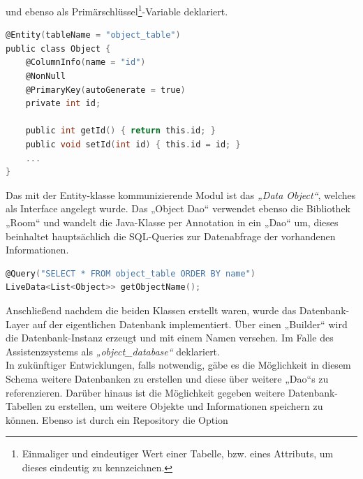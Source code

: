 und ebenso als Primärschlüssel\footnote{Einmaliger und eindeutiger Wert einer Tabelle, bzw. eines Attributs, um dieses eindeutig zu kennzeichnen.}-Variable 
deklariert.
\\ 
\linebreak
\begin{lstlisting}[language=C,
    frame=lines,           % Ein Rahmen um den Code (single for box, lines for top and bottom)
    xleftmargin=\parindent,  % Rahmen link von den Zahlen
    style=algoBericht,
    label={code:entity},
    captionpos=b,           % Caption unter den Code setzen
caption={Entity Code zur Initialisierung der Objekte}]
@Entity(tableName = "object_table")
public class Object {
    @ColumnInfo(name = "id")
    @NonNull
    @PrimaryKey(autoGenerate = true)
    private int id;

    public int getId() { return this.id; }
    public void setId(int id) { this.id = id; }
    ... 
}
\end{lstlisting}
\pagebreak
Das mit der Entity-klasse kommunizierende Modul ist das \textit{„Data Object“}, welches als Interface angelegt wurde. Das „Object Dao“ verwendet ebenso die Bibliothek 
„Room“ und wandelt die Java-Klasse per Annotation in ein „Dao“ um, dieses beinhaltet hauptsächlich die SQL-Queries zur Datenabfrage der vorhandenen Informationen. 
\\
\linebreak
\begin{lstlisting}[language=C,
    frame=lines,           % Ein Rahmen um den Code (single for box, lines for top and bottom)
    xleftmargin=\parindent,  % Rahmen link von den Zahlen
    style=algoBericht,
    label={code:query},
    captionpos=b,           % Caption unter den Code setzen
caption={SQL-Query zur Abfrage der Objekt-Namen}]
@Query("SELECT * FROM object_table ORDER BY name")
LiveData<List<Object>> getObjectName();
\end{lstlisting}
Anschließend nachdem die beiden Klassen erstellt waren, wurde das Datenbank-Layer auf der eigentlichen Datenbank implementiert. Über einen „Builder“ wird die 
Datenbank-Instanz erzeugt und mit einem Namen versehen. Im Falle des Assistenzsystems als \textit{„object\_database“} deklariert. 
\\ 
In zukünftiger Entwicklungen, 
falls notwendig, gäbe es die Möglichkeit in diesem Schema weitere Datenbanken zu erstellen und diese über weitere „Dao“s zu referenzieren. Darüber hinaus ist die 
Möglichkeit gegeben weitere Datenbank-Tabellen zu erstellen, um weitere Objekte und Informationen speichern zu können. Ebenso ist durch ein Repository die Option 
